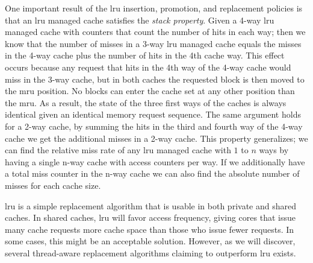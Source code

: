 One important result of the \gls{lru} insertion, promotion, and replacement policies is that an \gls{lru} managed cache satisfies the \textit{stack property}.
Given a 4-way \gls{lru} managed cache with counters that count the number of hits in each way; then we know that the number of misses in a 3-way \gls{lru} managed cache equals the misses in the 4-way cache plus the number of hits in the 4th cache way.
This effect occurs because any request that hits in the 4th way of the 4-way cache would miss in the 3-way cache, but in both caches the requested block is then moved to the \gls{mru} position.
No blocks can enter the cache set at any other position than the \gls{mru}.
As a result, the state of the three first ways of the caches is always identical given an identical memory request sequence.
The same argument holds for a 2-way cache, by summing the hits in the third and fourth way of the 4-way cache we get the additional misses in a 2-way cache.
This property generalizes; we can find the relative miss rate of any \gls{lru} managed cache with $1$ to $n$ ways by having a single n-way cache with access counters per way.
If we additionally have a total miss counter in the n-way cache we can also find the absolute number of misses for each cache size.

\gls{lru} is a simple replacement algorithm that is usable in both private and shared caches.
In shared caches, \gls{lru} will favor access frequency, giving cores that issue many cache requests more cache space than those who issue fewer requests. 
In some cases, this might be an acceptable solution. 
However, as we will discover, several thread-aware replacement algorithms claiming to outperform \gls{lru} exists. 
